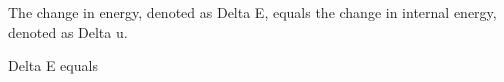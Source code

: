 The change in energy, denoted as Delta E, equals the change in internal energy, denoted as Delta u. 

Delta E equals
